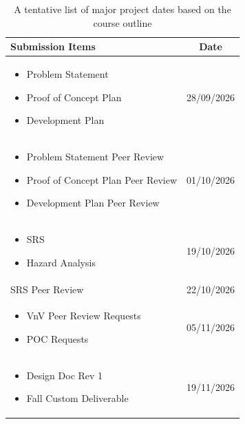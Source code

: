 \documentclass{article}
\begin{document}
\begin{table}[htbp] 
    \centering
    \renewcommand{\arraystretch}{1.3} 
    \caption{A tentative list of major project dates based on the course outline}
    \label{tab:my_table}
    
 
    \begin{tabular}{@{} m{7.5cm} c @{}}
    \toprule
    \textbf{Submission Items} & \textbf{Date} \\ 
    \midrule
    
    \begin{itemize}[nosep, leftmargin=*]
      \item Problem Statement
      \item Proof of Concept Plan
      \item Development Plan
    \end{itemize}  &  28/09/2026  \\ 
    \midrule
    
    \begin{itemize}[nosep, leftmargin=*]
      \item Problem Statement Peer Review
      \item Proof of Concept Plan Peer Review
      \item Development Plan Peer Review
    \end{itemize}  &  01/10/2026  \\ 
    \midrule
    
    \begin{itemize}[nosep, leftmargin=*]
      \item SRS
      \item Hazard Analysis
    \end{itemize}   & 19/10/2026  \\ 
    \midrule
    
    SRS Peer Review & 22/10/2026  \\ 
    \midrule
    
    \begin{itemize}[nosep, leftmargin=*]
      \item VnV Peer Review Requests
      \item POC Requests
    \end{itemize} & 05/11/2026 \\ 
    \midrule
    
    \begin{itemize}[nosep, leftmargin=*]
      \item Design Doc Rev 1
      \item Fall Custom Deliverable
    \end{itemize} & 19/11/2026 \\ 
    \midrule
    

\end{tabular}
\end{table}
\end{document}
